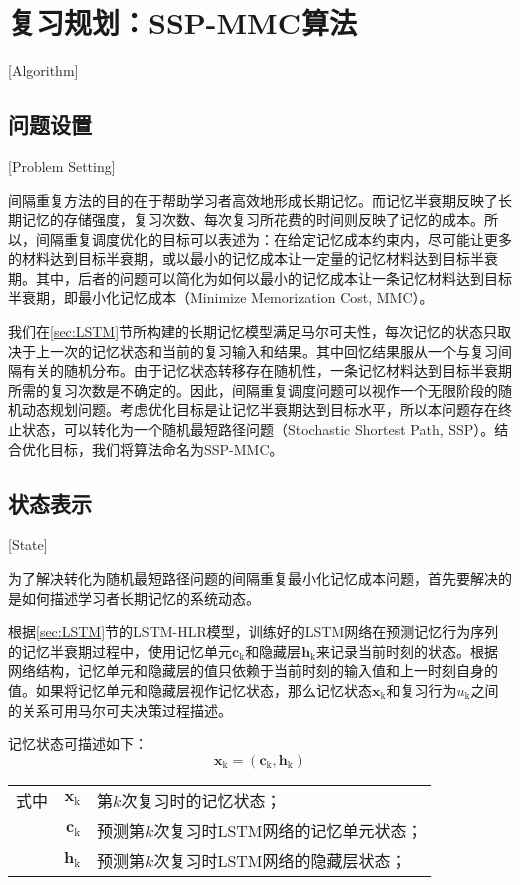 \section{复习规划：SSP-MMC算法}[Algorithm]

\subsection{问题设置}[Problem Setting]

间隔重复方法的目的在于帮助学习者高效地形成长期记忆。而记忆半衰期反映了长期记忆的存储强度，复习次数、每次复习所花费的时间则反映了记忆的成本。所以，间隔重复调度优化的目标可以表述为：在给定记忆成本约束内，尽可能让更多的材料达到目标半衰期，或以最小的记忆成本让一定量的记忆材料达到目标半衰期。其中，后者的问题可以简化为如何以最小的记忆成本让一条记忆材料达到目标半衰期，即最小化记忆成本（Minimize Memorization Cost, MMC）。

我们在\ref{sec:LSTM}节所构建的长期记忆模型满足马尔可夫性，每次记忆的状态只取决于上一次的记忆状态和当前的复习输入和结果。其中回忆结果服从一个与复习间隔有关的随机分布。由于记忆状态转移存在随机性，一条记忆材料达到目标半衰期所需的复习次数是不确定的。因此，间隔重复调度问题可以视作一个无限阶段的随机动态规划问题。考虑优化目标是让记忆半衰期达到目标水平，所以本问题存在终止状态，可以转化为一个随机最短路径问题\cite[177-182]{bertsekasReinforcementLearningOptimal2019}（Stochastic Shortest Path, SSP）。结合优化目标，我们将算法命名为SSP-MMC。

\subsection{状态表示}[State]

为了解决转化为随机最短路径问题的间隔重复最小化记忆成本问题，首先要解决的是如何描述学习者长期记忆的系统动态。

根据\ref{sec:LSTM}节的LSTM-HLR模型，训练好的LSTM网络在预测记忆行为序列的记忆半衰期过程中，使用记忆单元$\bm c_\mathrm{k}$和隐藏层$\bm h_\mathrm{k}$来记录当前时刻的状态。根据网络结构，记忆单元和隐藏层的值只依赖于当前时刻的输入值和上一时刻自身的值。如果将记忆单元和隐藏层视作记忆状态，那么记忆状态$\bm x_\mathrm{k}$和复习行为$u_\mathrm{k}$之间的关系可用马尔可夫决策过程描述。

记忆状态可描述如下：
\begin{equation}
\bm x_\mathrm{k} = (\bm c_\mathrm{k},\bm h_\mathrm{k})
\end{equation}
\begin{tabularx}{\textwidth}{@{}l@{\quad}r@{———}X@{}}
    式中& $\bm x_\mathrm{k}$ &第$k$次复习时的记忆状态；\\
    &  $\bm c_\mathrm{k}$ &预测第$k$次复习时LSTM网络的记忆单元状态；\\
    &  $\bm h_\mathrm{k}$ &预测第$k$次复习时LSTM网络的隐藏层状态；
\end{tabularx}\vspace{3.15bp}

